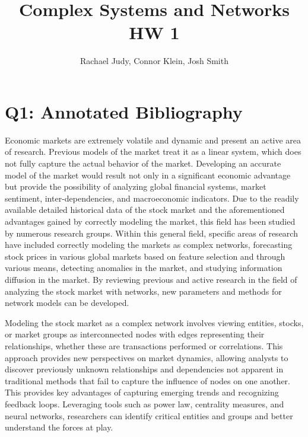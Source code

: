 \documentclass[12pt]{article}
\title{Complex Systems and Networks HW 1}
\author{Rachael Judy, Connor Klein, Josh Smith}
\begin{document}
\pgfplotsset{compat=1.18}
 
\maketitle

\section{Q1: Annotated Bibliography}

Economic markets are extremely volatile and dynamic and present an active area of research. Previous models of the market treat it as a linear system, which does not fully capture the actual behavior of the market. Developing an accurate model of the market would result not only in a significant economic advantage but provide the possibility of analyzing global financial systems, market sentiment, inter-dependencies, and macroeconomic indicators. Due to the readily available detailed historical data of the stock market and the aforementioned advantages gained by correctly modeling the market, this field has been studied by numerous research groups. Within this general field, specific areas of research have included correctly modeling the markets as complex networks, forecasting stock prices in various global markets based on feature selection and through various means, detecting anomalies in the market, and studying information diffusion in the market. By reviewing previous and active research in the field of analyzing the stock market with networks, new parameters and methods for network models can be developed.



Modeling the stock market as a complex network involves viewing entities, stocks, or market groups as interconnected nodes with edges representing their relationships, whether these are transactions performed or correlations. This approach provides new perspectives on market dynamics, allowing analysts to discover previously unknown relationships and dependencies not apparent in traditional methods that fail to capture the influence of nodes on one another. This provides key advantages of capturing emerging trends and recognizing feedback loops. Leveraging tools such as power law, centrality measures, and neural networks, researchers can identify critical entities and groups and better understand the forces at play.
\end{document}
